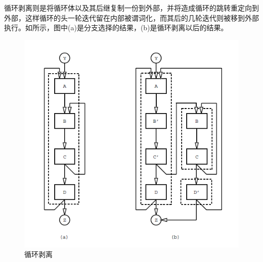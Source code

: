 循环剥离则是将循环体以及其后继复制一份到外部，并将造成循环的跳转重定向到外部，这样循环的头一轮迭代留在内部被谓词化，而其后的几轮迭代则被移到外部执行。如所示，图中(a)是分支选择的结果，(b)是循环剥离以后的结果。
\begin{figure}
\includegraphics[width=\linewidth]{mechanism/hyperblock-lp}
\caption{\label{fig:looppeeling} 循环剥离}
\end{figure}
